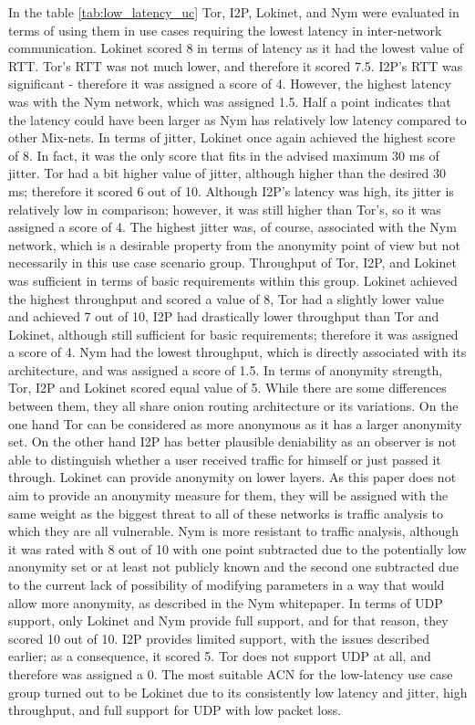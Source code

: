 In the table \ref{tab:low_latency_uc} Tor, I2P, Lokinet, and Nym were evaluated in terms of using them in use cases requiring the lowest latency in inter-network communication. Lokinet scored 8 in terms of latency as it had the lowest value of RTT. Tor's RTT was not much lower, and therefore it scored 7.5. I2P's RTT was significant - therefore it was assigned a score of 4. However, the highest latency was with the Nym network, which was assigned 1.5. Half a point indicates that the latency could have been larger as Nym has relatively low latency compared to other Mix-nets.
In terms of jitter, Lokinet once again achieved the highest score of 8. In fact, it was the only score that fits in the advised maximum 30 ms of jitter. Tor had a bit higher value of jitter, although higher than the desired 30 ms; therefore it scored 6 out of 10. Although I2P's latency was high, its jitter is relatively low in comparison; however, it was still higher than Tor's, so it was assigned a score of 4. The highest jitter was, of course, associated with the Nym network, which is a desirable property from the anonymity point of view but not necessarily in this use case scenario group.
Throughput of Tor, I2P, and Lokinet was sufficient in terms of basic requirements within this group. Lokinet achieved the highest throughput and scored a value of 8, Tor had a slightly lower value and achieved 7 out of 10, I2P had drastically lower throughput than Tor and Lokinet, although still sufficient for basic requirements; therefore it was assigned a score of 4. Nym had the lowest throughput, which is directly associated with its architecture, and was assigned a score of 1.5.
In terms of anonymity strength, Tor, I2P and Lokinet scored equal value of 5. While there are some differences between them, they all share onion routing architecture or its variations. On the one hand Tor can be considered as more anonymous as it has a larger anonymity set. On the other hand I2P has better plausible deniability as an observer is not able to distinguish whether a user received traffic for himself or just passed it through. Lokinet can provide anonymity on lower layers. As this paper does not aim to provide an anonymity measure for them, they will be assigned with the same weight as the biggest threat to all of these networks is traffic analysis to which they are all vulnerable. Nym is more resistant to traffic analysis, although it was rated with 8 out of 10 with one point subtracted due to the potentially low anonymity set or at least not publicly known and the second one subtracted due to the current lack of possibility of modifying parameters in a way that would allow more anonymity, as described in the Nym whitepaper.
In terms of UDP support, only Lokinet and Nym provide full support, and for that reason, they scored 10 out of 10. I2P provides limited support, with the issues described earlier; as a consequence, it scored 5. Tor does not support UDP at all, and therefore was assigned a 0.
The most suitable ACN for the low-latency use case group turned out to be Lokinet due to its consistently low latency and jitter, high throughput, and full support for UDP with low packet loss.

